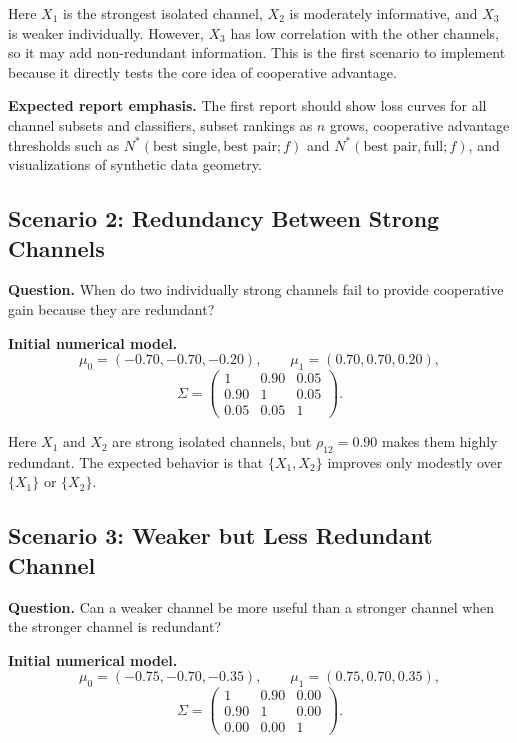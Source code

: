 \documentclass[11pt,a4paper]{article}
\begin{document}
Here $X_1$ is the strongest isolated channel, $X_2$ is moderately informative, and $X_3$ is weaker individually. However, $X_3$ has low correlation with the other channels, so it may add non-redundant information. This is the first scenario to implement because it directly tests the core idea of cooperative advantage.

\textbf{Expected report emphasis.} The first report should show loss curves for all channel subsets and classifiers, subset rankings as $n$ grows, cooperative advantage thresholds such as $N^*(\text{best single},\text{best pair};f)$ and $N^*(\text{best pair},\text{full};f)$, and visualizations of synthetic data geometry.

\subsection{Scenario 2: Redundancy Between Strong Channels}

\textbf{Question.} When do two individually strong channels fail to provide cooperative gain because they are redundant?

\textbf{Initial numerical model.}
\[
    \mu_0=(-0.70,-0.70,-0.20),
    \qquad
    \mu_1=(0.70,0.70,0.20),
\]
\[
\Sigma=
\begin{pmatrix}
1 & 0.90 & 0.05\\
0.90 & 1 & 0.05\\
0.05 & 0.05 & 1
\end{pmatrix}.
\]

Here $X_1$ and $X_2$ are strong isolated channels, but $\rho_{12}=0.90$ makes them highly redundant. The expected behavior is that $\{X_1,X_2\}$ improves only modestly over $\{X_1\}$ or $\{X_2\}$.

\subsection{Scenario 3: Weaker but Less Redundant Channel}

\textbf{Question.} Can a weaker channel be more useful than a stronger channel when the stronger channel is redundant?

\textbf{Initial numerical model.}
\[
    \mu_0=(-0.75,-0.70,-0.35),
    \qquad
    \mu_1=(0.75,0.70,0.35),
\]
\[
\Sigma=
\begin{pmatrix}
1 & 0.90 & 0.00\\
0.90 & 1 & 0.00\\
0.00 & 0.00 & 1
\end{pmatrix}.
\]
\end{document}
